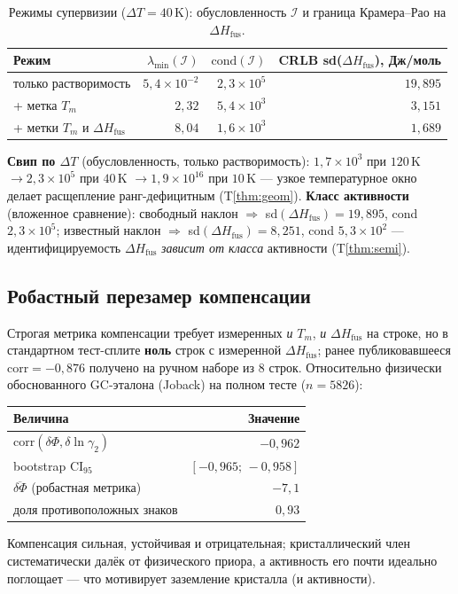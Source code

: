\documentclass[11pt]{article}
\theoremstyle{plain}
\theoremstyle{definition}
\newcommand{\dHfus}{\Delta H_{\mathrm{fus}}}
\newcommand{\Tm}{T_m}
\newcommand{\lng}{\ln\gamma_2}
\begin{document}
\begin{table}[h]
\centering
\caption{Режимы супервизии ($\Delta T=40$\,K): обусловленность $\mathcal I$ и
граница Крамера--Рао на $\dHfus$.}
\begin{tabular}{lrrr}
\toprule
Режим & $\lambda_{\min}(\mathcal I)$ & $\mathrm{cond}(\mathcal I)$ & CRLB sd($\dHfus$), Дж/моль \\
\midrule
только растворимость & $5{,}4\times10^{-2}$ & $2{,}3\times10^{5}$ & $19{,}895$ \\
\;+ метка $\Tm$ & $2{,}32$ & $5{,}4\times10^{3}$ & $3{,}151$ \\
\;+ метки $\Tm$ и $\dHfus$ & $8{,}04$ & $1{,}6\times10^{3}$ & $1{,}689$ \\
\bottomrule
\end{tabular}
\end{table}

\noindent
\textbf{Свип по $\Delta T$} (обусловленность, только растворимость):
$1{,}7\times10^{3}$ при $120$\,K $\to 2{,}3\times10^{5}$ при $40$\,K $\to
1{,}9\times10^{16}$ при $10$\,K --- узкое температурное окно делает расщепление
ранг-дефицитным (T\ref{thm:geom}). \textbf{Класс активности} (вложенное
сравнение): свободный наклон $\Rightarrow$ sd$(\dHfus)=19{,}895$, cond
$2{,}3\times10^5$; известный наклон $\Rightarrow$ sd$(\dHfus)=8{,}251$, cond
$5{,}3\times10^2$ --- идентифицируемость $\dHfus$ \emph{зависит от класса}
активности (T\ref{thm:semi}).

\subsection{Робастный перезамер компенсации}
Строгая метрика компенсации требует измеренных \emph{и} $\Tm$, \emph{и} $\dHfus$
на строке, но в стандартном тест-сплите \textbf{ноль} строк с измеренной
$\dHfus$; ранее публиковавшееся $\mathrm{corr}=-0{,}876$ получено на ручном
наборе из $8$ строк. Относительно физически обоснованного GC-эталона (Joback) на
полном тесте ($n=5826$):
\begin{center}
\begin{tabular}{lr}
\toprule
Величина & Значение \\
\midrule
$\mathrm{corr}(\delta\Phi,\delta\lng)$ & $-0{,}962$ \\
\quad bootstrap CI$_{95}$ & $[-0{,}965;\,-0{,}958]$ \\
$\overline{\delta\Phi}$ (робастная метрика) & $-7{,}1$ \\
доля противоположных знаков & $0{,}93$ \\
\bottomrule
\end{tabular}
\end{center}
Компенсация сильная, устойчивая и отрицательная; кристаллический член
систематически далёк от физического приора, а активность его почти идеально
поглощает --- что мотивирует заземление кристалла (и активности).
\end{document}

